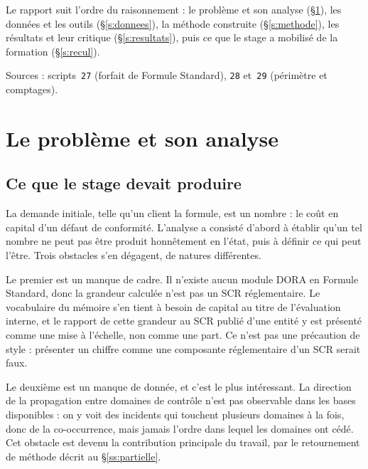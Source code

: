 \documentclass[12pt,a4paper]{article}
\theoremstyle{definition}
\begin{document}
Le rapport suit l'ordre du raisonnement : le problème et son analyse
(\S\ref{s:probleme}), les données et les outils (\S\ref{s:donnees}), la méthode
construite (\S\ref{s:methode}), les résultats et leur critique
(\S\ref{s:resultats}), puis ce que le stage a mobilisé de la formation
(\S\ref{s:recul}).

\vspace{4pt}
\noindent Sources : scripts~\texttt{27} (forfait de Formule Standard),
\texttt{28} et~\texttt{29} (périmètre et comptages).

\section{Le problème et son analyse}
\label{s:probleme}

\subsection{Ce que le stage devait produire}
\label{ss:produire}

La demande initiale, telle qu'un client la formule, est un nombre : le coût en
capital d'un défaut de conformité. L'analyse a consisté d'abord à établir qu'un
tel nombre ne peut pas être produit honnêtement en l'état, puis à définir ce qui
peut l'être. Trois obstacles s'en dégagent, de natures différentes.

Le premier est un manque de cadre. Il n'existe aucun module DORA en Formule
Standard, donc la grandeur calculée n'est pas un SCR réglementaire. Le vocabulaire
du mémoire s'en tient à \og{}besoin de capital au titre de l'évaluation interne\fg{},
et le rapport de cette grandeur au SCR publié d'une entité y est présenté comme
une mise à l'échelle, non comme une part. Ce n'est pas une précaution de style :
présenter un chiffre comme une composante réglementaire d'un SCR serait faux.

Le deuxième est un manque de donnée, et c'est le plus intéressant. La direction de
la propagation entre domaines de contrôle n'est pas observable dans les bases
disponibles : on y voit des incidents qui touchent plusieurs domaines à la fois,
donc de la co-occurrence, mais jamais l'ordre dans lequel les domaines ont cédé.
Cet obstacle est devenu la contribution principale du travail, par le retournement
de méthode décrit au \S\ref{ss:partielle}.
\end{document}
